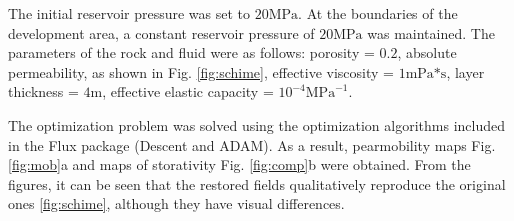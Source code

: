 \documentclass[
11pt,%
tightenlines,%
twoside,%
onecolumn,%
nofloats,%
nobibnotes,%
nofootinbib,%
superscriptaddress,%
noshowpacs,%
centertags]%
{revtex4}
\begin{document}
The initial reservoir pressure was set to $20 \text{MPa}$. At the boundaries of the development area, a constant reservoir pressure of $20 \text{MPa}$ was maintained. The parameters of the rock and fluid were as follows: porosity = $0.2$, absolute permeability, as shown in Fig. \ref{fig:schime}, effective viscosity = $1 \text{mPa*s}$, layer thickness = $4 \text{m}$, effective elastic capacity = $10^{-4} \text{MPa}^{-1}$.

The optimization problem was solved using the optimization algorithms included in the Flux package (Descent and ADAM). As a result, pearmobility maps Fig. \ref{fig:mob}a and maps of storativity Fig. \ref{fig:comp}b were obtained.
From the figures, it can be seen that the restored fields qualitatively reproduce the original ones \ref{fig:schime}, although they have visual differences.
\end{document}
